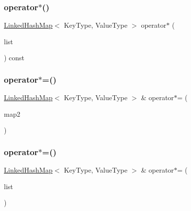 \mbox{\label{classLinkedHashMap_a84194e9735d5407828399ef5ed99c77e}} 
\subsubsection{\texorpdfstring{operator$\ast$()}{operator*()}\hspace{0.1cm}{\footnotesize\ttfamily [2/2]}}
{\footnotesize\ttfamily \mbox{\hyperlink{classLinkedHashMap}{Linked\+Hash\+Map}}$<$ Key\+Type, Value\+Type $>$ operator$\ast$ (\begin{DoxyParamCaption}\item[{std\+::initializer\+\_\+list$<$ std\+::pair$<$ Key\+Type, Value\+Type $>$ $>$}]{list }\end{DoxyParamCaption}) const}

\mbox{\label{classLinkedHashMap_ae1ab3cc43d53ccab9c73548083ae0ed0}} 
\subsubsection{\texorpdfstring{operator$\ast$=()}{operator*=()}\hspace{0.1cm}{\footnotesize\ttfamily [1/2]}}
{\footnotesize\ttfamily \mbox{\hyperlink{classLinkedHashMap}{Linked\+Hash\+Map}}$<$ Key\+Type, Value\+Type $>$ \& operator$\ast$= (\begin{DoxyParamCaption}\item[{const \mbox{\hyperlink{classLinkedHashMap}{Linked\+Hash\+Map}}$<$ Key\+Type, Value\+Type $>$ \&}]{map2 }\end{DoxyParamCaption})}

\mbox{\label{classLinkedHashMap_af810d63ea278546e8c720048e718c363}} 
\subsubsection{\texorpdfstring{operator$\ast$=()}{operator*=()}\hspace{0.1cm}{\footnotesize\ttfamily [2/2]}}
{\footnotesize\ttfamily \mbox{\hyperlink{classLinkedHashMap}{Linked\+Hash\+Map}}$<$ Key\+Type, Value\+Type $>$ \& operator$\ast$= (\begin{DoxyParamCaption}\item[{std\+::initializer\+\_\+list$<$ std\+::pair$<$ Key\+Type, Value\+Type $>$ $>$}]{list }\end{DoxyParamCaption})}

